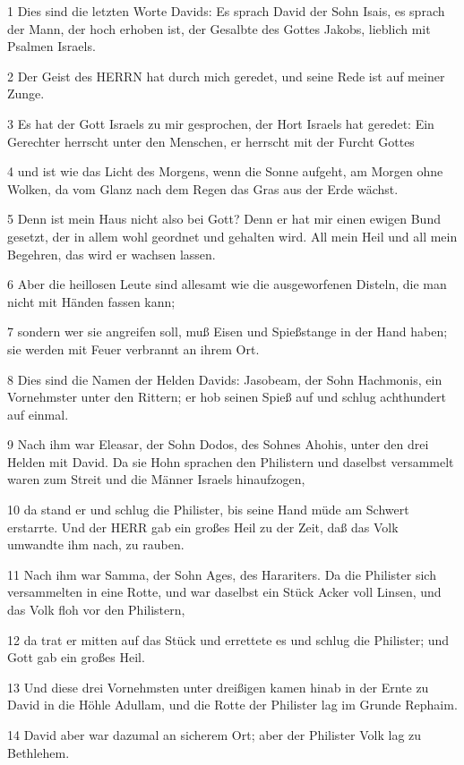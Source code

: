 \par 1 Dies sind die letzten Worte Davids: Es sprach David der Sohn Isais, es sprach der Mann, der hoch erhoben ist, der Gesalbte des Gottes Jakobs, lieblich mit Psalmen Israels.
\par 2 Der Geist des HERRN hat durch mich geredet, und seine Rede ist auf meiner Zunge.
\par 3 Es hat der Gott Israels zu mir gesprochen, der Hort Israels hat geredet: Ein Gerechter herrscht unter den Menschen, er herrscht mit der Furcht Gottes
\par 4 und ist wie das Licht des Morgens, wenn die Sonne aufgeht, am Morgen ohne Wolken, da vom Glanz nach dem Regen das Gras aus der Erde wächst.
\par 5 Denn ist mein Haus nicht also bei Gott? Denn er hat mir einen ewigen Bund gesetzt, der in allem wohl geordnet und gehalten wird. All mein Heil und all mein Begehren, das wird er wachsen lassen.
\par 6 Aber die heillosen Leute sind allesamt wie die ausgeworfenen Disteln, die man nicht mit Händen fassen kann;
\par 7 sondern wer sie angreifen soll, muß Eisen und Spießstange in der Hand haben; sie werden mit Feuer verbrannt an ihrem Ort.
\par 8 Dies sind die Namen der Helden Davids: Jasobeam, der Sohn Hachmonis, ein Vornehmster unter den Rittern; er hob seinen Spieß auf und schlug achthundert auf einmal.
\par 9 Nach ihm war Eleasar, der Sohn Dodos, des Sohnes Ahohis, unter den drei Helden mit David. Da sie Hohn sprachen den Philistern und daselbst versammelt waren zum Streit und die Männer Israels hinaufzogen,
\par 10 da stand er und schlug die Philister, bis seine Hand müde am Schwert erstarrte. Und der HERR gab ein großes Heil zu der Zeit, daß das Volk umwandte ihm nach, zu rauben.
\par 11 Nach ihm war Samma, der Sohn Ages, des Harariters. Da die Philister sich versammelten in eine Rotte, und war daselbst ein Stück Acker voll Linsen, und das Volk floh vor den Philistern,
\par 12 da trat er mitten auf das Stück und errettete es und schlug die Philister; und Gott gab ein großes Heil.
\par 13 Und diese drei Vornehmsten unter dreißigen kamen hinab in der Ernte zu David in die Höhle Adullam, und die Rotte der Philister lag im Grunde Rephaim.
\par 14 David aber war dazumal an sicherem Ort; aber der Philister Volk lag zu Bethlehem.
